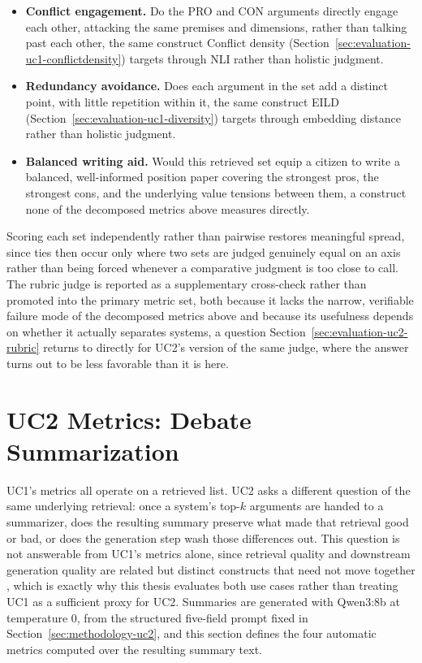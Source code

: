 \begin{itemize}
\item \textbf{Conflict engagement.} Do the PRO and CON arguments directly engage each other,
attacking the same premises and dimensions, rather than talking past each other, the same construct
Conflict density (Section~\ref{sec:evaluation-uc1-conflictdensity}) targets through NLI rather than
holistic judgment.

\item \textbf{Redundancy avoidance.} Does each argument in the set add a distinct point, with
little repetition within it, the same construct EILD (Section~\ref{sec:evaluation-uc1-diversity})
targets through embedding distance rather than holistic judgment.

\item \textbf{Balanced writing aid.} Would this retrieved set equip a citizen to write a balanced,
well-informed position paper covering the strongest pros, the strongest cons, and the underlying
value tensions between them, a construct none of the decomposed metrics above measures directly.
\end{itemize}

Scoring each set independently rather than pairwise restores meaningful spread, since ties then
occur only where two sets are judged genuinely equal on an axis rather than being forced whenever a
comparative judgment is too close to call. The rubric judge is reported as a supplementary
cross-check rather than promoted into the primary metric set, both because it lacks the narrow,
verifiable failure mode of the decomposed metrics above and because its usefulness depends on
whether it actually separates systems, a question Section~\ref{sec:evaluation-uc2-rubric} returns
to directly for UC2's version of the same judge, where the answer turns out to be less favorable
than it is here.

\section{UC2 Metrics: Debate Summarization}
\label{sec:evaluation-uc2}

UC1's metrics all operate on a retrieved list. UC2 asks a different question of the same
underlying retrieval: once a system's top-$k$ arguments are handed to a summarizer, does the
resulting summary preserve what made that retrieval good or bad, or does the generation step wash
those differences out. This question is not answerable from UC1's metrics alone, since retrieval
quality and downstream generation quality are related but distinct constructs that need not move
together \cite{samuel2026beyond}, which is exactly why this thesis evaluates both use cases rather
than treating UC1 as a sufficient proxy for UC2. Summaries are generated with Qwen3:8b
\cite{yang2025qwen3} at temperature 0, from the structured five-field prompt fixed in
Section~\ref{sec:methodology-uc2}, and this section defines the four automatic metrics computed
over the resulting summary text.

